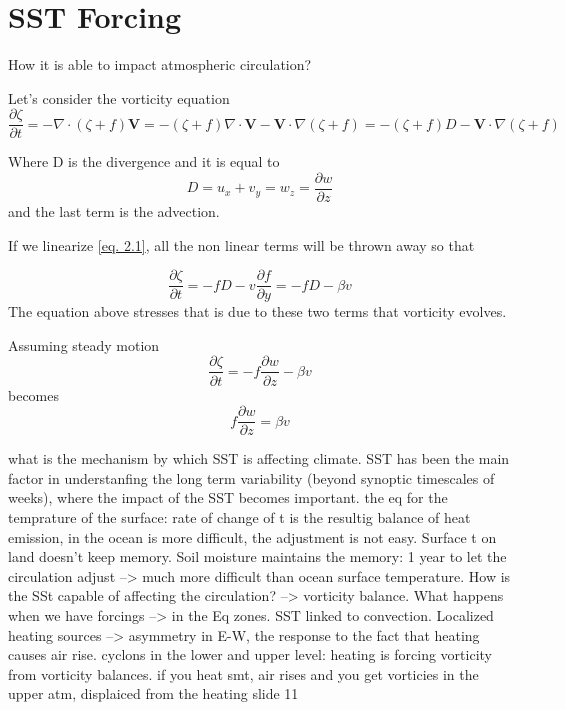 
\chapter{SST Forcing} %
How it is able to impact atmospheric circulation?

Let's consider the vorticity equation
\begin{equation}\label{eq. 2.1}
	\frac{\partial \zeta}{\partial t} = - \nabla \cdot (\zeta + f) \mathbf{V} = - (\zeta + f) \nabla \cdot \mathbf{V} - \mathbf{V} \cdot \nabla (\zeta + f) = - (\zeta + f) D - \mathbf{V} \cdot \nabla (\zeta + f)
\end{equation}

Where D is the divergence and it is equal to $$D=u_x + v_y = w_z = \frac{\partial w}{\partial z}$$
and the last term is the advection.

If we linearize \ref{eq. 2.1}, all the non linear terms will be thrown away so that

$$\frac{\partial \zeta}{\partial t} = - f D - v \frac{\partial f}{\partial y} = - f D - \beta v $$
The equation above stresses that is due to these two terms that vorticity evolves.

Assuming steady motion $$\frac{\partial \zeta}{\partial t} = - f \frac{\partial w}{\partial z} - \beta v$$  becomes $$f \frac{\partial w}{\partial z} = \beta v$$



what is the mechanism by which SST is affecting climate. SST has been the main factor in understanfing the long term variability (beyond synoptic timescales of weeks), where the impact of the SST becomes important.
the eq for the temprature of the surface: rate of change of t is the resultig balance of heat emission, in the ocean is more difficult, the adjustment is not easy. Surface t on land doesn't keep memory. Soil moisture maintains the memory: 1 year to let the circulation adjust --> much more difficult than ocean surface temperature. How is the SSt capable of affecting the circulation? --> vorticity balance. What happens when we have forcings --> in the Eq zones. SST linked to convection. Localized heating sources --> asymmetry in E-W, the response to the fact that heating causes air rise. cyclons in the lower and upper level: heating is forcing vorticity from vorticity balances. if you heat smt, air rises and you get vorticies in the upper atm, displaiced from the heating slide 11

